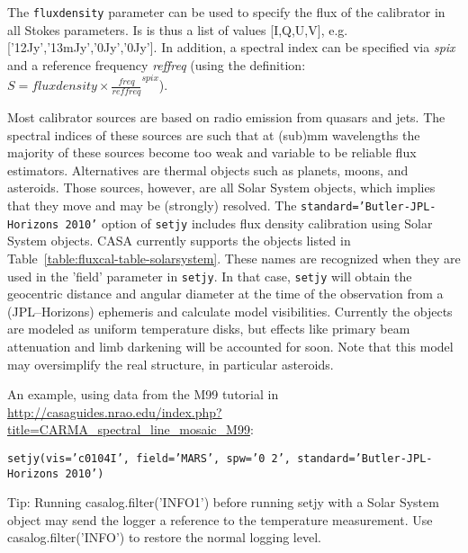 The {\tt fluxdensity} parameter can be used to specify the flux of the
calibrator in all Stokes parameters. Is is thus a list of values
[I,Q,U,V], e.g. ['12Jy','13mJy','0Jy','0Jy']. In addition, a spectral
index can be specified via {\it spix} and a reference frequency {\it
  reffreq} (using the definition: $S = fluxdensity\times\frac{
  freq}{reffreq}^{spix}$).


Most calibrator sources are based on radio emission from quasars and
jets. The spectral indices of these sources are such that at (sub)mm
wavelengths the majority of these sources become too weak and variable
to be reliable flux estimators. Alternatives are thermal objects such
as planets, moons, and asteroids. Those sources, however, are all
Solar System objects, which implies that they move and may be
(strongly) resolved. The {\tt standard='Butler-JPL-Horizons 2010'}
option of {\tt setjy} includes flux density calibration using Solar
System objects. CASA currently supports the objects listed in
Table~\ref{table:fluxcal-table-solarsystem}. These names are
recognized when they are used in the 'field' parameter in {\tt setjy}.
In that case, {\tt setjy} will obtain the geocentric distance and
angular diameter at the time of the observation from a (JPL--Horizons)
ephemeris and calculate model visibilities.  Currently the objects are
modeled as uniform temperature disks, but effects like primary beam
attenuation and limb darkening will be accounted for soon. Note that
this model may oversimplify the real structure, in particular
asteroids.

An example, using data from the M99 tutorial in 
\url{http://casaguides.nrao.edu/index.php?title=CARMA_spectral_line_mosaic_M99}:

{\tt setjy(vis='c0104I', field='MARS', spw='0~2', standard='Butler-JPL-Horizons 2010')}

Tip: Running casalog.filter('INFO1') before running setjy with a Solar
System object may send the logger a reference to the temperature
measurement.  Use casalog.filter('INFO') to restore the normal logging
level.

